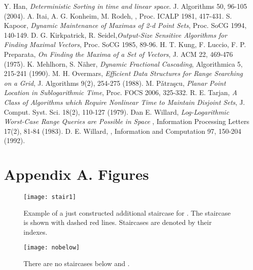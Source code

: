 \documentclass[10pt]{llncs}
\begin{document}
\begin{thebibliography}{99}
Y. Han, {\em Deterministic Sorting in  time and linear space}. 
J. Algorithms 50, 96-105 (2004).
  A. Itai, A. G. Konheim, M. Rodeh, 
,
\newblock   Proc.  ICALP 1981, 417-431.
 S. Kapoor, {\em Dynamic Maintenance of Maximas of 2-d Point Sets},  Proc.  SoCG 1994, 140-149.
D. G. Kirkpatrick, R. Seidel,{\em Output-Size Sensitive Algorithms for Finding 
Maximal Vectors}, Proc. SoCG 1985,  89-96.
H. T. Kung, F. Luccio, F. P. Preparata, {\em  On Finding the Maxima of a Set of Vectors}, J. ACM 22, 469-476 (1975).
K. Mehlhorn, S. N\"aher, {\em Dynamic Fractional Cascading}, 
Algorithmica 5, 215-241 (1990).
M. H. Overmars, {\em Efficient Data Structures for Range Searching on a Grid}, J. Algorithms 9(2),  254-275 (1988).
M. P\v{a}tra\c{s}cu, {\em Planar Point Location in Sublogarithmic Time}, 
Proc. FOCS 2006, 325-332.
 R. E. Tarjan, 
{\em A Class of Algorithms which Require Nonlinear Time to Maintain Disjoint
 Sets}, 
J. Comput. Syst. Sci. 18(2), 110-127 (1979).
Dan E. Willard, {\em  Log-Logarithmic Worst-Case Range Queries are Possible in
 Space },
Information  Processing Letters 17(2), 81-84 (1983).
D. E. Willard,
, 
\newblock Information and  Computation 97, 150-204 (1992).
\end{thebibliography}

\newpage 


\section*{Appendix A. Figures}




\begin{figure}[htb]
  \centering
  \texttt{[image: stair1]}
\caption{
  Example of a just constructed additional staircase  for . 
  The staircase  is shown with dashed red lines. 
  Staircases are denoted by their indexes. 
 }
  \label{fig:stair1}
\end{figure} 

\begin{figure}[bt]
  \centering
\texttt{[image: nobelow]}
\caption{There are no staircases below  and .}
\label{fig:nobelow}
\end{figure}
\end{document}
